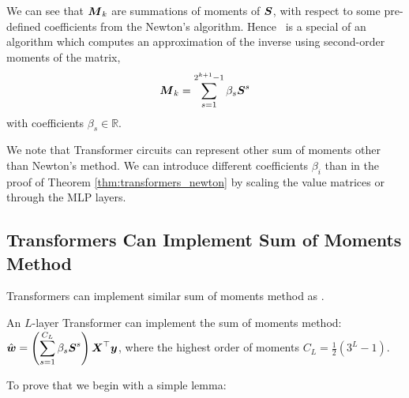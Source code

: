 We can see that $\boldsymbol{M}_k$ are  summations of moments of $\boldsymbol{S}$, with respect to some pre-defined coefficients from the Newton's algorithm. Hence \newton\ is a special of an algorithm which computes an approximation of the inverse using second-order moments of the matrix, 
\begin{equation}
    \boldsymbol{M}_k = \sum_{s=1}^{2^{k+1} - 1} \beta_s \boldsymbol{S}^s
\label{eqn:som}
\end{equation}
with coefficients $\beta_s \in \mathbb R$.

We note that Transformer circuits can represent other sum of moments other than Newton's method. We can introduce different coefficients $\beta_i$ than in the proof of Theorem \ref{thm:transformers_newton} by scaling the value matrices or through the MLP layers. 

\iffalse

\subsection{Transformers Can Implement Sum of Moments Method}
Transformers can implement similar sum of moments method as . 
\begin{theorem}\label{thm:tf_som}
    An $L$-layer Transformer can implement the sum of moments method: $\displaystyle \hat{\boldsymbol{w}} = \left(\sum_{s=1}^{C_{L}} \beta_s \boldsymbol{S}^s\right) \boldsymbol{X}^\top \boldsymbol{y}$, where the highest order of moments $C_L = \frac{1}{2} \left(3^L - 1\right)$.
\end{theorem}

To prove that we begin with a simple lemma:

